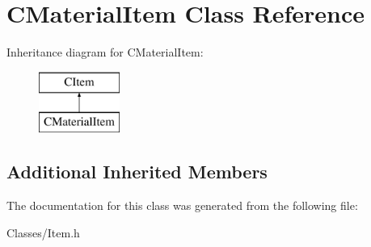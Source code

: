\hypertarget{class_c_material_item}{}\section{C\+Material\+Item Class Reference}
\label{class_c_material_item}
Inheritance diagram for C\+Material\+Item\+:\begin{figure}[H]
\begin{center}
\leavevmode
\includegraphics[height=2.000000cm]{class_c_material_item}
\end{center}
\end{figure}
\subsection*{Additional Inherited Members}


The documentation for this class was generated from the following file\+:\begin{DoxyCompactItemize}
\item 
Classes/Item.\+h\end{DoxyCompactItemize}
